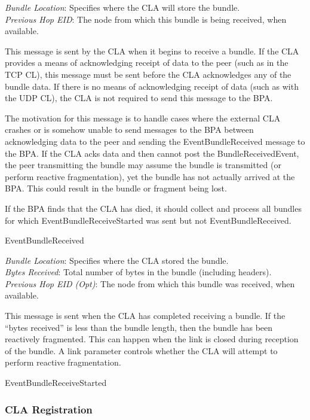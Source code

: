 {
\metP
    {\em Bundle Location}: Specifies where the CLA will store the bundle.\\
    {\em Previous Hop EID}: The node from which this bundle is being
    received, when available.

\metD
    This message is sent by the CLA when it begins to receive a bundle. If
    the CLA provides a means of acknowledging receipt of data to the peer
    (such as in the TCP CL), this message must be sent before the CLA
    acknowledges any of the bundle data. If there is no means of
    acknowledging receipt of data (such as with the UDP CL), the CLA is not
    required to send this message to the BPA.

    The motivation for this message is to handle cases where the external
    CLA crashes or is somehow unable to send messages to the BPA between
    acknowledging data to the peer and sending the EventBundleReceived
    message to the BPA. If the CLA acks data and then cannot post the
    BundleReceivedEvent, the peer transmitting the bundle may assume the
    bundle is transmitted (or perform reactive fragmentation), yet the
    bundle has not actually arrived at the BPA. This could result in the
    bundle or fragment being lost.

    If the BPA finds that the CLA has died, it should collect and process
    all bundles for which EventBundleReceiveStarted was sent but not
    EventBundleReceived.

\metR
    EventBundleReceived
}

{
\metP
    {\em Bundle Location}: Specifies where the CLA stored the bundle.\\
    {\em Bytes Received}: Total number of bytes in the bundle (including
    headers).\\
    {\em Previous Hop EID (Opt)}: The node from which this bundle was 
    received, when available.

\metD
    This message is sent when the CLA has completed receiving a bundle. If the
    ``bytes received'' is less than the bundle length, then the bundle has been
    reactively fragmented. This can happen when the link is closed during
    reception of the bundle. A link parameter controls whether the CLA will
    attempt to perform reactive fragmentation. 

\metR
    EventBundleReceiveStarted
}

\subsubsection{CLA Registration}


